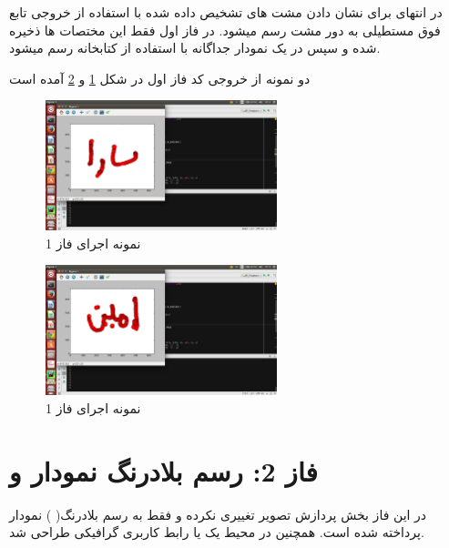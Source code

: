 \documentclass[oneside]{article}
\begin{document}
در انتهای برای نشان دادن مشت های تشخیص داده شده با استفاده از خروجی تابع فوق مستطیلی به دور مشت رسم میشود. 
در فاز اول فقط این مختصات ها ذخیره شده و سپس در یک نمودار جداگانه با استفاده از کتابخانه
 رسم میشود.

دو نمونه از خروجی کد فاز اول در شکل
\ref{Phase11}
و
\ref{Phase12}
آمده است

\begin{figure}
\centering
\includegraphics[width=0.6\textwidth]{Pictures/3.png}
\caption{نمونه اجرای فاز 1}
\label{Phase11}
\end{figure}

\begin{figure}
\centering
\includegraphics[width=0.6\textwidth]{Pictures/4.png}
\caption{نمونه اجرای فاز 1}
\label{Phase12}
\end{figure}

\section{فاز 2: رسم بلادرنگ نمودار و 
}
در این فاز بخش پردازش تصویر تغییری نکرده و فقط به رسم بلادرنگ(
) نمودار پرداخته شده است. همچنین در محیط 
یک 
یا رابط کاربری گرافیکی طراحی شد.
\end{document}
